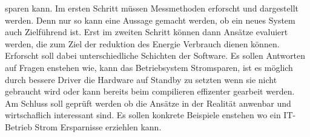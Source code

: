 sparen kann. Im ersten Schritt müssen Messmethoden erforscht und dargestellt werden. Denn nur so kann eine Aussage
gemacht werden, ob ein neues System auch Zielführend ist. Erst im zweiten Schritt können dann
Ansätze evaluiert werden, die zum Ziel der reduktion des Energie Verbrauch dienen können. Erforscht soll dabei
unterschiedliche Schichten der Software. Es sollen Antworten auf Fragen enstehen wie, kann das Betriebsystem
Stromsparen, ist es möglich durch bessere Driver die Hardware auf Standby zu setzten wenn sie nicht gebraucht wird oder
kann bereits beim compilieren effizenter gearbeit werden. Am Schluss soll geprüft werden
ob die Ansätze in der Realität anwenbar und wirtschaflich interessant sind. Es sollen konkrete Beispiele enstehen wo ein
IT-Betrieb Strom Ersparnisse erziehlen kann.

